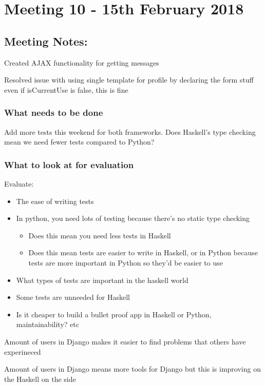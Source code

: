 \section{Meeting 10 - 15th February 2018}

\subsection{Meeting Notes:}
Created AJAX functionality for getting messages

Resolved issue with using single template for profile by declaring the form stuff even if isCurrentUse is false, this is fine

\subsubsection{What needs to be done}

Add more tests this weekend for both frameworks. Does Haskell's type checking mean we need fewer tests compared to Python?

\subsubsection{What to look at for evaluation}

Evaluate:
\begin{itemize}
	\item{The ease of writing tests}
	\item{In python, you need lots of testing because there's no static type checking}
	\begin{itemize}
    	\item{Does this mean you need less tests in Haskell}
    	\item{Does this mean tests are easier to write in Haskell, or in Python because tests are more important in Python so they'd be easier to use}
	\end{itemize}
	\item{What types of tests are important in the haskell world}
	\item{Some tests are unneeded for Haskell}
	\item{Is it cheaper to build a bullet proof app in Haskell or Python, maintainability? etc}
\end{itemize}

Amount of users in Django makes it easier to find problems that others have experineced

Amount of users in Django means more tools for Django but this is improving on the Haskell on the side

